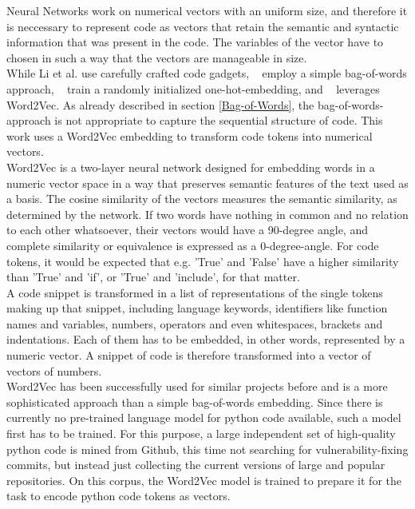 \documentclass[
	a4paper,
	pagesize,
	pdftex,
	12pt,
	twoside, %
	BCOR=5mm, %
	ngerman,
	fleqn,
	final,
	]{scrartcl}
\begin{document}
Neural Networks work on numerical vectors with an uniform size, and therefore it is neccessary to represent code as vectors that retain the semantic and syntactic information that was present in the code. The variables of the vector have to chosen in such a way that the vectors are manageable in size.\\
While Li et al.\cite{Li.2018} use carefully crafted code gadgets, ~\cite{Hovsepyan.2012} employ a simple bag-of-words approach, ~\cite{Russell.2018} train a randomly initialized one-hot-embedding, and ~\cite{Liu.2018} leverages Word2Vec. As already described in section \ref{Bag-of-Words}, the bag-of-words-approach is not appropriate to capture the sequential structure of code. This work uses a Word2Vec embedding to transform code tokens into numerical vectors.\\
Word2Vec is a two-layer neural network designed for embedding words in a numeric vector space in a way that preserves semantic features of the text used as a basis. The cosine similarity of the vectors measures the semantic similarity, as determined by the network. If two words have nothing in common and no relation to each other whatsoever, their vectors would have a 90-degree angle, and complete similarity or equivalence is expressed as a 0-degree-angle. For code tokens, it would be expected that e.g. 'True' and 'False' have a higher similarity than 'True' and 'if', or 'True' and 'include', for that matter.\\
A code snippet is transformed in a list of representations of the single tokens making up that snippet, including language keywords, identifiers like function names and variables, numbers, operators and even whitespaces, brackets and indentations. Each of them has to be embedded, in other words, represented by a numeric vector. A snippet of code is therefore transformed into a vector of vectors of numbers.\\
Word2Vec has been successfully used for similar projects before \cite{Liu.2018} and is a more sophisticated approach than a simple bag-of-words embedding. Since there is currently no pre-trained language model for python code available, such a model first has to be trained. For this purpose, a large independent set of high-quality python code is mined from Github, this time not searching for vulnerability-fixing commits, but instead just collecting the current versions of large and popular repositories. On this corpus, the Word2Vec model is trained to prepare it for the task to encode python code tokens as vectors.
\end{document}
